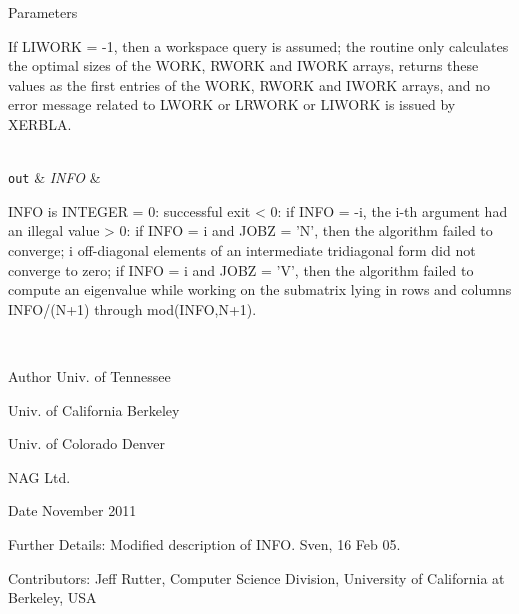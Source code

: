\begin{DoxyParams}[1]{Parameters}
\begin{DoxyVerb}
          If LIWORK = -1, then a workspace query is assumed; the
          routine only calculates the optimal sizes of the WORK, RWORK
          and IWORK arrays, returns these values as the first entries
          of the WORK, RWORK and IWORK arrays, and no error message
          related to LWORK or LRWORK or LIWORK is issued by XERBLA.\end{DoxyVerb}
\\
\hline
\mbox{\tt out}  & {\em I\+N\+F\+O} & \begin{DoxyVerb}          INFO is INTEGER
          = 0:  successful exit
          < 0:  if INFO = -i, the i-th argument had an illegal value
          > 0:  if INFO = i and JOBZ = 'N', then the algorithm failed
                to converge; i off-diagonal elements of an intermediate
                tridiagonal form did not converge to zero;
                if INFO = i and JOBZ = 'V', then the algorithm failed
                to compute an eigenvalue while working on the submatrix
                lying in rows and columns INFO/(N+1) through
                mod(INFO,N+1).\end{DoxyVerb}
 \\
\hline
\end{DoxyParams}
\begin{DoxyAuthor}{Author}
Univ. of Tennessee 

Univ. of California Berkeley 

Univ. of Colorado Denver 

N\+A\+G Ltd. 
\end{DoxyAuthor}
\begin{DoxyDate}{Date}
November 2011 
\end{DoxyDate}
\begin{DoxyParagraph}{Further Details\+: }
Modified description of I\+N\+F\+O. Sven, 16 Feb 05. 
\end{DoxyParagraph}
\begin{DoxyParagraph}{Contributors\+: }
Jeff Rutter, Computer Science Division, University of California at Berkeley, U\+S\+A 
\end{DoxyParagraph}
